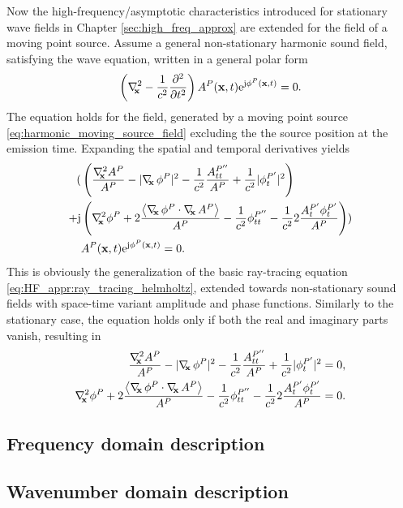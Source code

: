 Now the high-frequency/asymptotic characteristics introduced for stationary wave fields in Chapter \ref{sec:high_freq_approx} are extended for the field of a moving point source.
Assume a general non-stationary harmonic sound field, satisfying the wave equation, written in a general polar form
\begin{equation}
\left( \nabla^2_{\!\!\mathbf{x}} - \frac{1}{c^2}\frac{\partial^2}{\partial t^2}\right) A^P(\mathbf{x},t) \mathrm{e}^{\mathrm{j} \phi^P(\mathbf{x},t)} = 0.
\end{equation}
The equation holds for the field, generated by a moving point source \eqref{eq:harmonic_moving_source_field} excluding the the source position at the emission time.
Expanding the spatial and temporal derivatives yields
\begin{align}
(&\left( 
\frac{\Lx A^P}{A^P} 
- 
| \Dx \phi^P |^2
-\frac{1}{c^2} \frac{A^{P''}_{tt}}{A^P} 
+\frac{1}{c^2} |\phi^{P'}_{t}|^2 
\right) \nonumber\\ 
+ \ti &\left(  
\Lx \phi^P
+ 2\frac{ \left< \Dx \phi^P \cdot \Dx A^P \right> }{A^P}  - \frac{1}{c^2} \phi^{P''}_{tt} - \frac{1}{c^2} 2\frac{A^{P'}_t \phi^{P'}_t }{A^P} 
\right) ) \\
& A^P(\vx,t) \te^{\ti \phi^P(\vx,t)}  = 0. \nonumber
\label{eq:HF_appr:ray_tracing_helmholtz_nonstat}
\end{align}
This is obviously the generalization of the basic ray-tracing equation \eqref{eq:HF_appr:ray_tracing_helmholtz}, extended towards non-stationary sound fields with space-time variant amplitude and phase functions.
Similarly to the stationary case, the equation holds only if both the real and imaginary parts vanish, resulting in
\begin{eqnarray} \label{eq:HF_appr:eikonal_eq_non_stat}
\frac{\Lx A^P}{A^P}  - | \Dx \phi^P |^2 -\frac{1}{c^2} \frac{A^{P''}_{tt}}{A^P} +\frac{1}{c^2}|\phi^{P'}_{t}|^2 = 0, \\ 
\label{eq:HF_appr:transport_eq_non_stat}
\Lx \phi^P + 2\frac{ \left< \Dx \phi^P \cdot \Dx A^P \right> }{A^P} - \frac{1}{c^2} \phi^{P''}_{tt} - \frac{1}{c^2} 2\frac{A^{P'}_t \phi^{P'}_t }{A^P} = 0.
\end{eqnarray}

\subsection{Frequency domain description}
\subsection{Wavenumber domain description}
	
